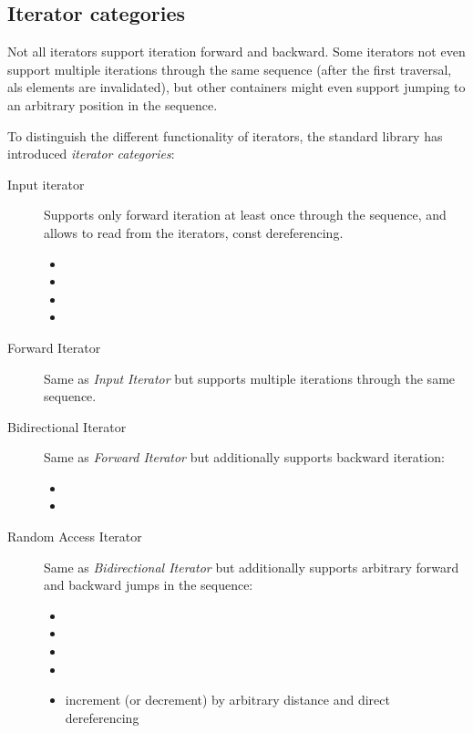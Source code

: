 \subsection{Iterator categories}
Not all iterators support iteration forward and backward. Some iterators not even support multiple iterations through the same sequence
(after the first traversal, als elements are invalidated), but other containers might even support jumping to an arbitrary position in the
sequence.

To distinguish the different functionality of iterators, the standard library has introduced \emph{iterator categories}:
\begin{description}
  \item[Input iterator]
    Supports only forward iteration at least once through the sequence, and allows to read from the iterators, \ie const dereferencing.
    \begin{itemize}
      \item {}
      \item {}
      \item {}
      \item {}
    \end{itemize}
  \item[Forward Iterator]
    Same as \emph{Input Iterator} but supports multiple iterations through the same sequence.
  \item[Bidirectional Iterator]
    Same as \emph{Forward Iterator} but additionally supports backward iteration:
    \begin{itemize}
      \item {}
      \item {}
    \end{itemize}
  \item[Random Access Iterator]
    Same as \emph{Bidirectional Iterator} but additionally supports arbitrary forward and backward jumps in the sequence:
    \begin{itemize}
      \item {}
      \item {}
      \item {}
      \item {}
      \item {} increment (or decrement) by arbitrary distance and direct dereferencing

\end{itemize}
\end{description}
